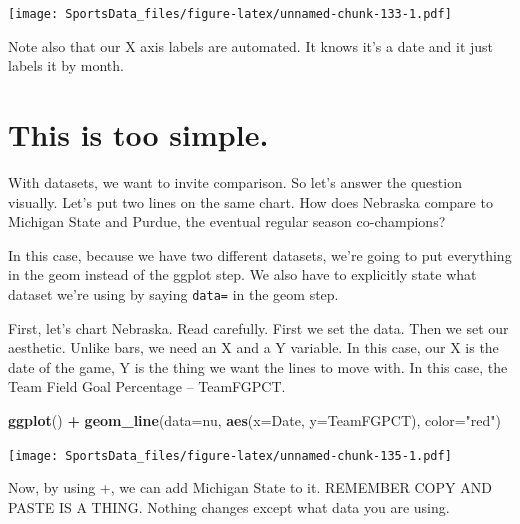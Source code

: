 \documentclass[]{book}
\newenvironment{Shaded}{\begin{snugshade}}{\end{snugshade}}
\newcommand{\DataTypeTok}[1]{\textcolor[rgb]{0.13,0.29,0.53}{#1}}
\newcommand{\KeywordTok}[1]{\textcolor[rgb]{0.13,0.29,0.53}{\textbf{#1}}}
\newcommand{\NormalTok}[1]{#1}
\newcommand{\OperatorTok}[1]{\textcolor[rgb]{0.81,0.36,0.00}{\textbf{#1}}}
\newcommand{\StringTok}[1]{\textcolor[rgb]{0.31,0.60,0.02}{#1}}
\begin{document}
\texttt{[image: SportsData\_files/figure-latex/unnamed-chunk-133-1.pdf]}

Note also that our X axis labels are automated. It knows it's a date and it just labels it by month.

\hypertarget{this-is-too-simple.}{%
\section{This is too simple.}\label{this-is-too-simple.}}

With datasets, we want to invite comparison. So let's answer the question visually. Let's put two lines on the same chart. How does Nebraska compare to Michigan State and Purdue, the eventual regular season co-champions?

\begin{Shaded}
\end{Shaded}

In this case, because we have two different datasets, we're going to put everything in the geom instead of the ggplot step. We also have to explicitly state what dataset we're using by saying \texttt{data=} in the geom step.

First, let's chart Nebraska. Read carefully. First we set the data. Then we set our aesthetic. Unlike bars, we need an X and a Y variable. In this case, our X is the date of the game, Y is the thing we want the lines to move with. In this case, the Team Field Goal Percentage -- TeamFGPCT.

\begin{Shaded}
\begin{Highlighting}[]
\KeywordTok{ggplot}\NormalTok{() }\OperatorTok{+}\StringTok{ }\KeywordTok{geom_line}\NormalTok{(}\DataTypeTok{data=}\NormalTok{nu, }\KeywordTok{aes}\NormalTok{(}\DataTypeTok{x=}\NormalTok{Date, }\DataTypeTok{y=}\NormalTok{TeamFGPCT), }\DataTypeTok{color=}\StringTok{"red"}\NormalTok{)}
\end{Highlighting}
\end{Shaded}

\texttt{[image: SportsData\_files/figure-latex/unnamed-chunk-135-1.pdf]}

Now, by using +, we can add Michigan State to it. REMEMBER COPY AND PASTE IS A THING. Nothing changes except what data you are using.
\end{document}
